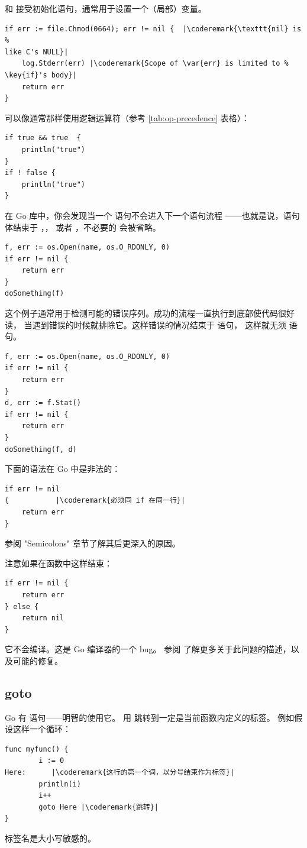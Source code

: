  和  接受初始化语句，通常用于设置一个（局部）变量。
\begin{lstlisting}
if err := file.Chmod(0664); err != nil {  |\coderemark{\texttt{nil} is %
like C's NULL}|
    log.Stderr(err) |\coderemark{Scope of \var{err} is limited to %
\key{if}'s body}|
    return err
}
\end{lstlisting}
可以像通常那样使用逻辑运算符（参考 \ref{tab:op-precedence} 表格）：
\begin{lstlisting}
if true && true  {
    println("true")
}
if ! false {
    println("true")
}
\end{lstlisting}

在 Go 库中，你会发现当一个  语句不会进入下一个语句流程
——也就是说，语句体结束于 ，，
或者 ，不必要的  会被省略。

\begin{lstlisting}
f, err := os.Open(name, os.O_RDONLY, 0)
if err != nil {
    return err
}
doSomething(f)
\end{lstlisting}
这个例子通常用于检测可能的错误序列。成功的流程一直执行到底部使代码很好读，
当遇到错误的时候就排除它。这样错误的情况结束于  语句，
这样就无须  语句。
\begin{lstlisting}
f, err := os.Open(name, os.O_RDONLY, 0)
if err != nil {
    return err
}
d, err := f.Stat()
if err != nil {
    return err
}
doSomething(f, d)
\end{lstlisting}
下面的语法在 Go 中是非法的：
\begin{lstlisting}
if err != nil
{		    |\coderemark{必须同 if 在同一行}|
    return err
}
\end{lstlisting}
参阅 \cite{effective_go} "Semicolons" 章节了解其后更深入的原因。

\begin{lbar}
注意如果在函数中这样结束：
\begin{lstlisting}
if err != nil {
    return err
} else {
    return nil
}
\end{lstlisting}
它不会编译。这是 Go 编译器的一个 bug。
参阅 \cite{go_issue_65} 了解更多关于此问题的描述，以及可能的修复。
\end{lbar}

\subsection{goto}
Go 有  语句——明智的使用它。
用  跳转到一定是当前函数内定义的标签。
例如假设这样一个循环：
\begin{lstlisting}
func myfunc() {
        i := 0                                                                                      
Here:	   |\coderemark{这行的第一个词，以分号结束作为标签}|
        println(i)
        i++ 
        goto Here |\coderemark{跳转}|
}
\end{lstlisting}
标签名是大小写敏感的。

